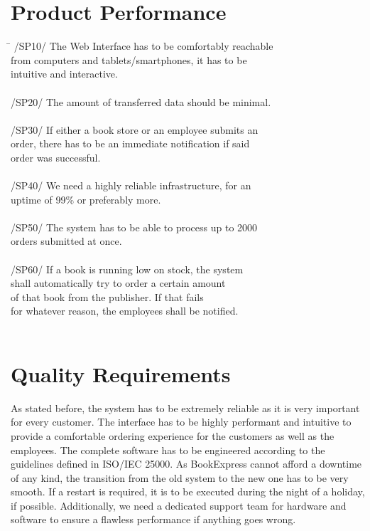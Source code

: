 \documentclass[a4paper,draft]{article}
\begin{document}
\section{Product Performance}
\begin{tabbing}
\hspace{3cm}\=\kill
	/SP10/ \> The Web Interface has to be comfortably reachable\\
	\> from computers and tablets/smartphones, it has to be \\
	\> intuitive and interactive.\\
	\\
	/SP20/ \> The amount of transferred data should be minimal.\\
	\\
	/SP30/ \> If either a book store or an employee submits an \\
	\> order, there has to be an immediate notification if said\\
	\> order was successful.\\
	\\
	/SP40/ \> We need a highly reliable infrastructure, for an \\
	\> uptime of 99\% or preferably more. \\
	\\
	/SP50/ \> The system has to be able to process up to 2000\\
	\> orders submitted at once.\\
	\\
	/SP60/ \> If a book is running low on stock, the system\\
	\> shall automatically try to order a certain amount \\
	\> of that book from the publisher.  If that fails\\
	\> for whatever reason, the employees shall be notified.\\
	\\
\end{tabbing} 
\section{Quality Requirements}
As stated before, the system has to be extremely reliable as it is very important for every customer. The interface has to be highly performant and intuitive to provide a comfortable ordering experience for the customers as well as the employees. The complete software has to be engineered according to the guidelines defined in ISO/IEC 25000. As BookExpress cannot afford a downtime of any kind, the transition from the old system to the new one has to be very smooth. If a restart is required, it is to be executed during the night of a holiday, if possible. Additionally, we need a dedicated support team for hardware and software to ensure a flawless performance if anything goes wrong.
\end{document}
